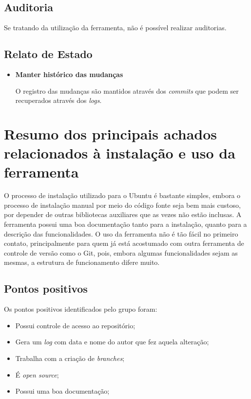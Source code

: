  \subsection{Auditoria}

  Se tratando da utilização da ferramenta, não é possível realizar auditorias.

 \subsection{Relato de Estado}
 \begin{itemize}
  \item \textbf{Manter histórico das mudanças}

  O registro das mudanças são mantidos através dos \textit{commits} que podem ser recuperados através dos \textit{logs}.

 \end{itemize}
\section{Resumo dos principais achados relacionados à instalação e uso da ferramenta}

	O processo de instalação utilizado para o Ubuntu é bastante simples, embora o processo de instalação manual por meio do
	código fonte seja bem mais custoso, por depender de outras bibliotecas auxiliares que as vezes não estão inclusas.
	A ferramenta possui uma boa documentação tanto para a instalação, quanto para a descrição das funcionalidades.
	O uso da ferramenta não é tão fácil no primeiro contato, principalmente para quem já está acostumado com outra ferramenta
	de controle de versão como o Git, pois, embora algumas funcionalidades sejam as mesmas, a estrutura de funcionamento difere muito.

	\subsection{Pontos positivos}

			Os pontos positivos identificados pelo grupo foram:

			\begin{itemize}
				\item Possui controle de acesso ao repositório;
				\item Gera um \textit{log} com data e nome do autor que fez aquela alteração;
				\item Trabalha com a criação de \textit{branches};
				\item É \textit{open source};
				\item Possui uma boa documentação;
			\end{itemize}


